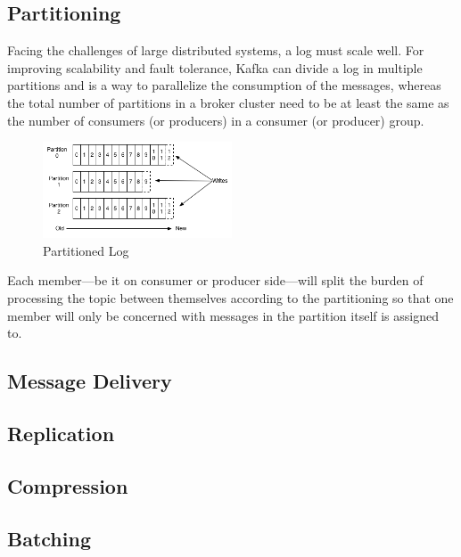 \subsection{Partitioning}
Facing the challenges of large distributed systems, a log must scale well. For
improving scalability and fault tolerance, Kafka can divide a log in multiple
partitions and is a way to parallelize the consumption of the messages, whereas
the total number of partitions in a broker cluster need to be at least the same
as the number of consumers (or producers) in a consumer (or producer) group.

\begin{figure}[H]
    \centering
    \includegraphics[width=0.5\textwidth]{images/log_anatomy.png}
    \caption{Partitioned Log \cite{apachekafka}}
    \label{fig:the-log}
\end{figure}

Each member---be it on consumer or producer side---will split the burden of
processing the topic between themselves according to the partitioning so that
one member will only be concerned with messages in the partition itself is
assigned to. 

\subsection{Message Delivery}

\subsection{Replication}

\subsection{Compression}

\subsection{Batching}


